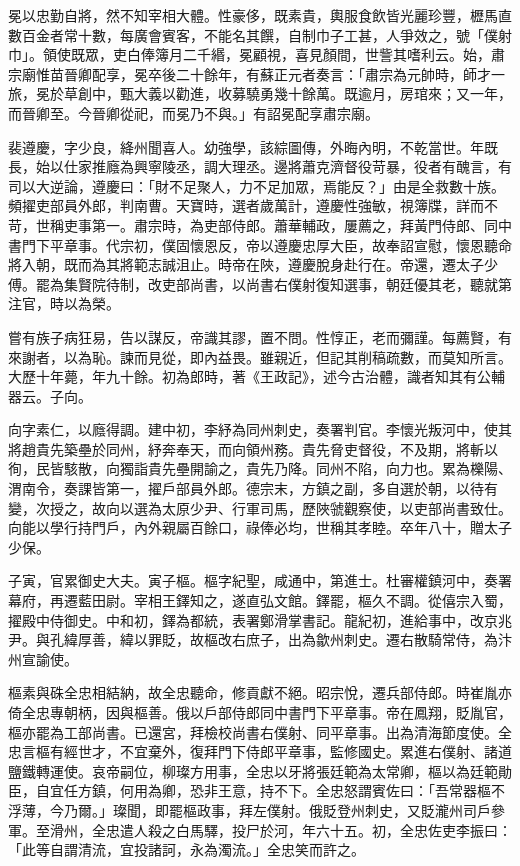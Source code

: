 \begin{pinyinscope}
 冕以忠勤自將，然不知宰相大體。性豪侈，既素貴，輿服食飲皆光麗珍豐，櫪馬直數百金者常十數，每廣會賓客，不能名其饌，自制巾子工甚，人爭效之，號「僕射巾」。領使既眾，吏白俸簿月二千緡，冕顧視，喜見顏間，世訾其嗜利云。始，肅宗廟惟苗晉卿配享，冕卒後二十餘年，有蘇正元者奏言：「肅宗為元帥時，師才一旅，冕於草創中，甄大義以勸進，收募驍勇幾十餘萬。既逾月，房琯來；又一年，而晉卿至。今晉卿從祀，而冕乃不與。」有詔冕配享肅宗廟。



 裴遵慶，字少良，絳州聞喜人。幼強學，該綜圖傳，外晦內明，不乾當世。年既長，始以仕家推廕為興寧陵丞，調大理丞。邊將蕭克濟督役苛暴，役者有醜言，有司以大逆論，遵慶曰：「財不足聚人，力不足加眾，焉能反？」由是全救數十族。頻擢吏部員外郎，判南曹。天寶時，選者歲萬計，遵慶性強敏，視簿牒，詳而不苛，世稱吏事第一。肅宗時，為吏部侍郎。蕭華輔政，屢薦之，拜黃門侍郎、同中書門下平章事。代宗初，僕固懷恩反，帝以遵慶忠厚大臣，故奉詔宣慰，懷恩聽命將入朝，既而為其將範志誠沮止。時帝在陜，遵慶脫身赴行在。帝還，遷太子少傅。罷為集賢院待制，改吏部尚書，以尚書右僕射復知選事，朝廷優其老，聽就第注官，時以為榮。



 嘗有族子病狂易，告以謀反，帝識其謬，置不問。性惇正，老而彌謹。每薦賢，有來謝者，以為恥。諫而見從，即內益畏。雖親近，但記其削稿疏數，而莫知所言。大歷十年薨，年九十餘。初為郎時，著《王政記》，述今古治體，識者知其有公輔器云。子向。



 向字素仁，以廕得調。建中初，李紓為同州刺史，奏署判官。李懷光叛河中，使其將趙貴先築壘於同州，紓奔奉天，而向領州務。貴先脅吏督役，不及期，將斬以徇，民皆駭散，向獨詣貴先壘開諭之，貴先乃降。同州不陷，向力也。累為櫟陽、渭南令，奏課皆第一，擢戶部員外郎。德宗末，方鎮之副，多自選於朝，以待有變，次授之，故向以選為太原少尹、行軍司馬，歷陜虢觀察使，以吏部尚書致仕。向能以學行持門戶，內外親屬百餘口，祿俸必均，世稱其孝睦。卒年八十，贈太子少保。



 子寅，官累御史大夫。寅子樞。樞字紀聖，咸通中，第進士。杜審權鎮河中，奏署幕府，再遷藍田尉。宰相王鐸知之，遂直弘文館。鐸罷，樞久不調。從僖宗入蜀，擢殿中侍御史。中和初，鐸為都統，表署鄭滑掌書記。龍紀初，進給事中，改京兆尹。與孔緯厚善，緯以罪貶，故樞改右庶子，出為歙州刺史。遷右散騎常侍，為汴州宣諭使。



 樞素與硃全忠相結納，故全忠聽命，修貢獻不絕。昭宗悅，遷兵部侍郎。時崔胤亦倚全忠專朝柄，因與樞善。俄以戶部侍郎同中書門下平章事。帝在鳳翔，貶胤官，樞亦罷為工部尚書。已還宮，拜檢校尚書右僕射、同平章事。出為清海節度使。全忠言樞有經世才，不宜棄外，復拜門下侍郎平章事，監修國史。累進右僕射、諸道鹽鐵轉運使。哀帝嗣位，柳璨方用事，全忠以牙將張廷範為太常卿，樞以為廷範勛臣，自宜任方鎮，何用為卿，恐非王意，持不下。全忠怒謂賓佐曰：「吾常器樞不浮薄，今乃爾。」璨聞，即罷樞政事，拜左僕射。俄貶登州刺史，又貶瀧州司戶參軍。至滑州，全忠遣人殺之白馬驛，投尸於河，年六十五。初，全忠佐吏李振曰：「此等自謂清流，宜投諸訶，永為濁流。」全忠笑而許之。




\end{pinyinscope}
